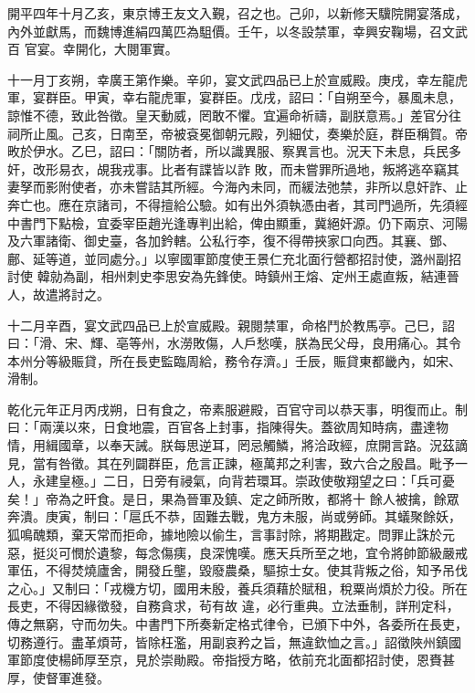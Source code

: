 
\begin{pinyinscope}

 開平四年十月乙亥，東京博王友文入覲，召之也。己卯，以新修天驥院開宴落成，內外並獻馬，而魏博進絹四萬匹為駔價。壬午，以冬設禁軍，幸興安鞠場，召文武百
 官宴。幸開化，大閱軍實。


十一月丁亥朔，幸廣王第作樂。辛卯，宴文武四品已上於宣威殿。庚戌，幸左龍虎軍，宴群臣。甲寅，幸右龍虎軍，宴群臣。戊戌，詔曰：「自朔至今，暴風未息，諒惟不德，致此咎徵。皇天動威，罔敢不懼。宜遍命祈禱，副朕意焉。」差官分往祠所止風。己亥，日南至，帝被袞冕御朝元殿，列細仗，奏樂於庭，群臣稱賀。帝畋於伊水。乙巳，詔曰：「關防者，所以識異服、察異言也。況天下未息，兵民多奸，改形易衣，覘我戎事。比者有諜皆以詐
 敗，而未嘗罪所過地，叛將逃卒竊其妻孥而影附使者，亦未嘗詰其所經。今海內未同，而緩法弛禁，非所以息奸詐、止奔亡也。應在京諸司，不得擅給公驗。如有出外須執憑由者，其司門過所，先須經中書門下點檢，宜委宰臣趙光逢專判出給，俾由顯重，冀絕奸源。仍下兩京、河陽及六軍諸衛、御史臺，各加鈐轄。公私行李，復不得帶挾家口向西。其襄、鄧、鄜、延等道，並同處分。」以寧國軍節度使王景仁充北面行營都招討使，潞州副招討使
 韓勍為副，相州刺史李思安為先鋒使。時鎮州王熔、定州王處直叛，結連晉人，故遣將討之。



 十二月辛酉，宴文武四品已上於宣威殿。親閱禁軍，命格鬥於教馬亭。己巳，詔曰：「滑、宋、輝、亳等州，水澇敗傷，人戶愁嘆，朕為民父母，良用痛心。其令本州分等級賑貸，所在長吏監臨周給，務令存濟。」壬辰，賑貸東都畿內，如宋、滑制。


乾化元年正月丙戌朔，日有食之，帝素服避殿，百官守司以恭天事，明復而止。制曰：「兩漢以來，日食地震，百官各上封事，指陳得失。蓋欲周知時病，盡達物情，用緝國章，以奉天誡。朕每思逆耳，罔忌觸鱗，將洽政經，庶開言路。況茲謫見，當有咎徵。其在列闢群臣，危言正諫，極萬邦之利害，致六合之殷昌。毗予一人，永建皇極。」二日，日旁有祲氣，向背若環耳。崇政使敬翔望之曰：「兵可憂矣！」帝為之旰食。是日，果為晉軍及鎮、定之師所敗，都將十
 餘人被擒，餘眾奔潰。庚寅，制曰：「扈氏不恭，固難去戰，鬼方未服，尚或勞師。其蟻聚餘妖，狐鳴醜類，棄天常而拒命，據地險以偷生，言事討除，將期戡定。問罪止誅於元惡，挺災可憫於遺黎，每念傷痍，良深愧嘆。應天兵所至之地，宜令將帥節級嚴戒軍伍，不得焚燒廬舍，開發丘壟，毀廢農桑，驅掠士女。使其背叛之俗，知予吊伐之心。」又制曰：「戎機方切，國用未殷，養兵須藉於賦租，稅粟尚煩於力役。所在長吏，不得因緣徵發，自務貪求，茍有故
 違，必行重典。立法垂制，詳刑定科，傳之無窮，守而勿失。中書門下所奏新定格式律令，已頒下中外，各委所在長吏，切務遵行。盡革煩苛，皆除枉濫，用副哀矜之旨，無違欽恤之言。」詔徵陜州鎮國軍節度使楊師厚至京，見於崇勛殿。帝指授方略，依前充北面都招討使，恩賚甚厚，使督軍進發。



\end{pinyinscope}
